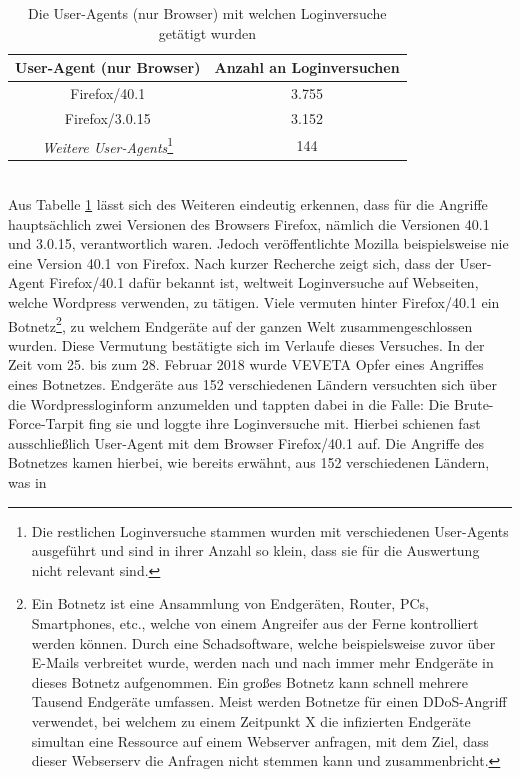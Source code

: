 \begin{table}[htb!]
	\centering
	\begin{tabular}{c|c}
		\textbf{User-Agent (nur Browser)}&\textbf{Anzahl an Loginversuchen}\\\hline
		Firefox/40.1 & 3.755 \\
		Firefox/3.0.15 & 3.152 \\
		\emph{Weitere User-Agents}\footnote{Die restlichen Loginversuche stammen wurden mit verschiedenen User-Agents ausgeführt und sind in ihrer Anzahl so klein, dass sie für die Auswertung nicht relevant sind.} & 144
	\end{tabular}
	\caption{Die User-Agents (nur Browser) mit welchen Loginversuche getätigt wurden}
	\label{tab:top-user-agent}
\end{table}
\\Aus Tabelle \ref{tab:top-user-agent} lässt sich des Weiteren eindeutig erkennen, dass für die Angriffe hauptsächlich zwei Versionen des Browsers Firefox, nämlich die Versionen 40.1 und 3.0.15, verantwortlich waren. Jedoch veröffentlichte Mozilla beispielsweise nie eine Version 40.1 von Firefox.\cite{firefox-versions} Nach kurzer Recherche zeigt sich, dass der User-Agent Firefox/40.1 dafür bekannt ist, weltweit Loginversuche auf Webseiten, welche Wordpress verwenden, zu tätigen.\cite{firefox-40-1} Viele vermuten hinter Firefox/40.1 ein Botnetz\footnote{Ein Botnetz ist eine Ansammlung von Endgeräten, Router, PCs, Smartphones, etc., welche von einem Angreifer aus der Ferne kontrolliert werden können. Durch eine Schadsoftware, welche beispielsweise zuvor über E-Mails verbreitet wurde, werden nach und nach immer mehr Endgeräte in dieses Botnetz aufgenommen. Ein großes Botnetz kann schnell mehrere Tausend Endgeräte umfassen. Meist werden Botnetze für einen DDoS-Angriff verwendet, bei welchem zu einem Zeitpunkt X die infizierten Endgeräte simultan eine Ressource auf einem Webserver anfragen, mit dem Ziel, dass dieser Webserserv die Anfragen nicht stemmen kann und zusammenbricht.}, zu welchem Endgeräte auf der ganzen Welt zusammengeschlossen wurden.\cite{wordpress-botnetz} Diese Vermutung bestätigte sich im Verlaufe dieses Versuches. In der Zeit vom 25. bis zum 28. Februar 2018 wurde VEVETA Opfer eines Angriffes eines Botnetzes. Endgeräte aus 152 verschiedenen Ländern versuchten sich über die Wordpressloginform anzumelden und tappten dabei in die Falle: Die Brute-Force-Tarpit fing sie und loggte ihre Loginversuche mit. Hierbei schienen fast ausschließlich User-Agent mit dem Browser Firefox/40.1 auf. Die Angriffe des Botnetzes kamen hierbei, wie bereits erwähnt, aus 152 verschiedenen Ländern, was in 
